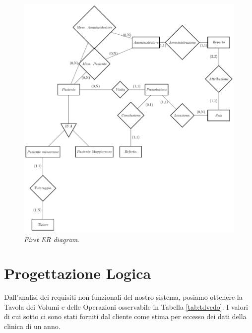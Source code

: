 \begin{figure}[!t]
\includegraphics[scale=0.8]{er2/first}
\caption{\textit{First ER diagram}.}
\label{fig:seed}
\end{figure}

\section{Progettazione Logica}\label{sec:proglogicadb}
Dall'analisi dei requisiti non funzionali del nostro sistema, posiamo ottenere 
la Tavola dei Volumi e delle Operazioni osservabile in Tabella \vref{tab:tdvedo}.
I valori di cui sotto ci sono stati forniti dal cliente come stima per eccesso
dei dati della clinica di un anno.


